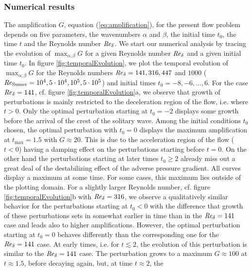 \documentclass{jfm}
\let\ge=\geqslant  \let\geq=\geqslant
\newcommand\Rey{\mbox{\textit{Re}}}  %
\newcommand\sumer{{\rm Sumer}}
\begin{document}
\subsubsection{Numerical results} \label{sec:numericalResults}

The amplification $ G $, equation (\ref{eq:amplification}),
for the present flow problem depends on five parameters,
the wavenumbers $ \alpha $ and $ \beta $, the initial time $ t_0 $,
the time $ t $ and the Reynolds number $ \Rey_\delta $. 
We start our numerical analysis by tracing the evolution of $ \max_{\alpha,\beta} G $
for a given Reynolds number $ \Rey_\delta $ and a given initial time $ t_0 $. 
In figure \ref{fig:temporalEvolution}, we plot the temporal
evolution of $ \max_{\alpha,\beta} G $ for the Reynolds numbers $ \Rey_\delta = 141, 316 , 447$ and $ 1000 $
($ \Rey_\sumer = 10^4 , 5\cdot 10^4 , 10^5 , 5\cdot 10^5 $)
and initial times $ t_0 = -8, -6, \ldots, 6 $. For the 
case $\Rey_\delta =141 $, cf. figure \ref{fig:temporalEvolution}a, 
we observe
that growth of perturbations is mainly restricted to the deceleration region
of the flow, i.e. where $ t > 0 $. Only the optimal perturbation starting
at $ t_0 = -2 $ displays some growth before the arrival
of the crest of the solitary wave. 
Among the initial conditions $ t_0 $ chosen, the optimal perturbation
with $ t_0 =0 $ displays the maximum amplification at $ t_{\max} = 1.5 $
with $ G \approx 20 $. 
This is due to the acceleration region of the flow ($ t < 0 $) having 
a damping effect on the perturbations starting before $ t = 0 $. On the
other hand the perturbations starting at later times $ t_0 \ge 2 $
already miss out a great deal of the destabilizing effect of the adverse
pressure gradient. All curves display a maximum at some time.
For some cases, this maximum lies outside of the plotting domain. 
For a slightly larger Reynolds number, cf. figure \ref{fig:temporalEvolution}b
with $ \Rey_\delta = 316 $, we observe a qualitatively similar behavior
for the perturbations starting at $ t_0 < 0 $ with the 
difference that growth of these perturbations
sets in somewhat earlier in time than in the $ \Rey_\delta = 141 $ case and leads
also to higher amplifications. However, the optimal perturbation
starting at $ t_0 = 0 $ behaves differently than the corresponding
one for the $ \Rey_\delta = 141 $ case. At early times, i.e. for $ t \lesssim 2 $, 
the evolution
of this perturbation is similar to the $ \Rey_\delta = 141 $
case. The perturbation grows to a maximum $ G \approx 100 $ at
$ t \approx 1.5 $,
before decaying again, but, at time $ t \approx 2 $, the 
\end{document}
